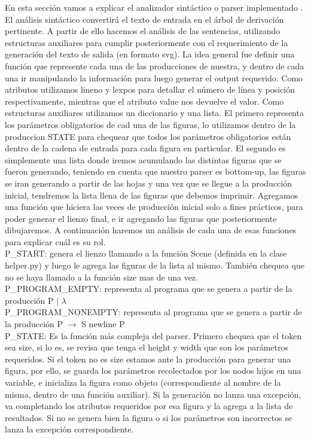 En esta sección vamos a explicar el analizador sintáctico o parser implementado . El análisis sintáctico convertirá el texto de entrada
en el árbol de derivación pertinente. A partir de ello hacemos el análisis de las sentencias, utilizando estructuras auxiliares para
cumplir posteriormente con el requerimiento de la generación del texto de salida (en formato svg).
La idea general fue definir una función que represente cada una de las producciones de nuestra, y dentro de cada una ir manipulando la
información para luego generar el output requerido.
Como atributos utilizamos lineno y lexpos para detallar el número de línea y posición respectivamente, mientras que el atributo value nos devuelve el valor.
Como estructuras auxiliares utilizamos un diccionario y una lista. El primero representa los parámetros obligatorios de cad una de las
figuras, lo utilizamos dentro de la produccion STATE para chequear que todos los parámetros obligatorios están dentro de la cadena de entrada
para cada figura en particular. El segundo es simplemente una lista donde iremos acumulando las distintas figuras que se fueron generando, teniendo
en cuenta que nuestro parser es bottom-up, las figuras se iran generando a partir de las hojas y una vez que se llegue a la producción inicial, tendremos
la lista llena de las figuras que debemos imprimir.
Agregamos una función que hiciera las veces de producción inicial solo a fines prácticos, para poder generar el lienzo final, e ir
agregando las figuras que posteriormente dibujaremos.
A continuación haremos un análisis de cada una de esas funciones para explicar cuál es su rol.\\

P_START: genera el lienzo llamando a la función Scene (definida en la clase helper.py) y luego le agrega las figuras de la lista al mismo.
También chequea que no se haya llamado a la función size mas de una vez.\\

P_PROGRAM_EMPTY: representa al programa que se genera a partir de la producción P $\mid$ $\lambda$\\

P_PROGRAM_NONEMPTY: representa al programa que se genera a partir de la producción P $\rightarrow$ S newline P\\

P_STATE: Es la función más compleja del parser. Primero chequea que el token sea size, si lo es, se revisa que tenga el height y width que son los parámetros requeridos.
Si el token no es size estamos ante la producción para generar una figura, por ello, se guarda los parámetros recolectados por los nodos hijos en una variable,
 e inicializa la figura como objeto (correspondiente al nombre de la misma, dentro de una función auxiliar).
Si la generación no lanza una excepción, va completando los atributos requeridos por esa figura y la agrega a la lista de resultados. Si no se genera bien la figura o si
los parámetros son incorrectos se lanza la excepción correspondiente.\\

